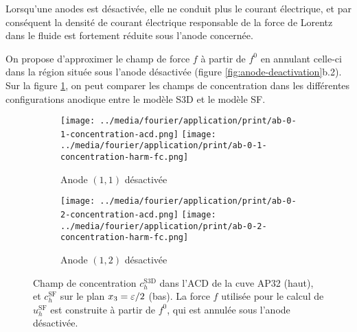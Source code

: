 Lorsqu'une anodes est désactivée, elle ne conduit plus le courant
électrique, et par conséquent la densité de courant électrique
responsable de la force de Lorentz dans le fluide est fortement
réduite sous l'anode concernée.

On propose d'approximer le champ de force $f$ à partir de $f^0$ en
annulant celle-ci dans la région située sous l'anode désactivée
(figure \ref{fig:anode-deactivation}b.2). Sur la figure
\ref{fig:harmonic-concentration-comp-fc}, on peut comparer les champs
de concentration dans les différentes configurations anodique entre le
modèle S3D et le modèle SF.


\begin{figure}[h!]
  \begin{center}
    \begin{subfigure}[t]{\textwidth}
      \texttt{[image: ../media/fourier/application/print/ab-0-1-concentration-acd.png]}
      \texttt{[image: ../media/fourier/application/print/ab-0-1-concentration-harm-fc.png]}
      \caption{Anode $(1,1)$ désactivée}
    \end{subfigure}

    \begin{subfigure}[t]{\textwidth}
      \texttt{[image: ../media/fourier/application/print/ab-0-2-concentration-acd.png]}
      \texttt{[image: ../media/fourier/application/print/ab-0-2-concentration-harm-fc.png]}
      \caption{Anode $(1,2)$ désactivée}
    \end{subfigure}


    \caption{Champ de concentration $c_h^\mathrm{S3D}$ dans l'ACD de
      la cuve AP32 (haut), et $c_h^\mathrm{SF}$ sur le plan
      $x_3 = \varepsilon / 2$ (bas). La force $f$ utilisée
      pour le calcul de $u_h^\mathrm{SF}$  est construite à
      partir de $f^0$, qui est annulée sous l'anode désactivée.}

    \label{fig:harmonic-concentration-comp-fc}
  \end{center}
\end{figure}


